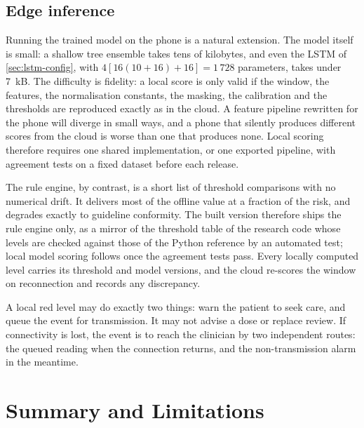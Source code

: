 \subsection{Edge inference}\label{sec:edge-inference}\label{sec:export-what}\label{sec:rule-export}\label{sec:version-stamp}\label{sec:local-alert}\label{sec:model-size}

Running the trained model on the phone is a natural extension. The model itself is small: a shallow tree ensemble takes tens of kilobytes, and even the LSTM of \cref{sec:lstm-config}, with $4[16(10+16)+16] = 1\,728$ parameters, takes under 7~kB. The difficulty is fidelity: a local score is only valid if the window, the features, the normalisation constants, the masking, the calibration and the thresholds are reproduced exactly as in the cloud. A feature pipeline rewritten for the phone will diverge in small ways, and a phone that silently produces different scores from the cloud is worse than one that produces none. Local scoring therefore requires one shared implementation, or one exported pipeline, with agreement tests on a fixed dataset before each release.

The rule engine, by contrast, is a short list of threshold comparisons with no numerical drift. It delivers most of the offline value at a fraction of the risk, and degrades exactly to guideline conformity. The built version therefore ships the rule engine only, as a mirror of the threshold table of the research code whose levels are checked against those of the Python reference by an automated test; local model scoring follows once the agreement tests pass. Every locally computed level carries its threshold and model versions, and the cloud re-scores the window on reconnection and records any discrepancy.

A local red level may do exactly two things: warn the patient to seek care, and queue the event for transmission. It may not advise a dose or replace review. If connectivity is lost, the event is to reach the clinician by two independent routes: the queued reading when the connection returns, and the non-transmission alarm in the meantime.


\section{Summary and Limitations}\label{sec:arch-summary}\label{sec:interface-limits}\label{sec:backend-limits}\label{sec:iot-limits}\label{sec:traceability}


